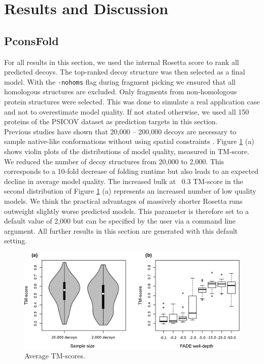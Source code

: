\documentclass{bioinfo}
\begin{document}
\begin{methods}
\end{methods}

\section{Results and Discussion}

\subsection{PconsFold}
For all results in this section, we used the internal Rosetta score to rank all predicted decoys. The top-ranked decoy structure was then selected as a final model. With the {\tt -nohoms} flag during fragment picking we ensured that all homologous structures are excluded. Only fragments from non-homologous protein structures were selected. This was done to simulate a real application case and not to overestimate model quality. If not stated otherwise, we used all 150 proteins of the PSICOV dataset as prediction targets in this section. \\\indent
Previous studies have shown that 20,000 -- 200,000 decoys are necessary to sample native-like conformations without using spatial constraints \cite[]{rosetta@home, rosetta_folding}. Figure \ref{fig:ros} (a) shows violin plots of the distributions of model quality, measured in TM-score. We reduced the number of decoy structures from 20,000 to 2,000. This corresponds to a 10-fold decrease of folding runtime but also leads to an expected decline in average model quality. The increased bulk at ~0.3 TM-score in the second distribution of Figure \ref{fig:ros} (a) represents an increased number of low quality models. We think the practical advantages of massively shorter Rosetta runs outweight slightly worse predicted models. This parameter is therefore set to a default value of 2,000 but can be specified by the user via a command line argument. All further results in this section are generated with this default setting. \\\indent
\begin{figure}[!tpb]%
    \centerline{\includegraphics[scale=0.35]{figures/rosetta.eps}}
\caption{Average TM-scores.}\label{fig:ros}
\end{figure}
\end{document}
